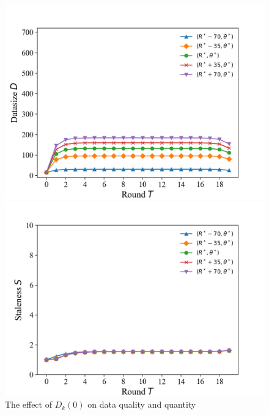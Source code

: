 \documentclass{article}
\theoremstyle{plain}
\theoremstyle{definition}
\theoremstyle{remark}
\begin{document}
\begin{figure}
\begin{minipage}{0.32\linewidth}
		\centerline{\includegraphics[width=\textwidth]{figures/figure_59_B.png}}
	\end{minipage}
  \begin{minipage}{0.32\linewidth}
		\vspace{3pt}
		\centerline{\includegraphics[width=\textwidth]{figures/figure_59_C.png}}
	\end{minipage}  
	\caption{The effect of $D_k(0)$ on data quality and quantity}
\end{figure}
\end{document}
